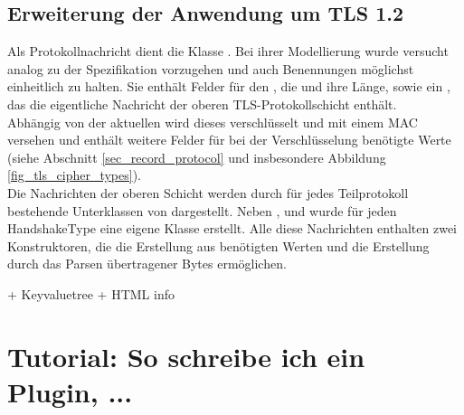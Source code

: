 \subsection{Erweiterung der Anwendung um TLS 1.2}


Als Protokollnachricht dient die Klasse . Bei ihrer Modellierung wurde versucht analog zu der Spezifikation vorzugehen und auch Benennungen möglichst einheitlich zu halten. Sie enthält Felder für den , die  und ihre Länge, sowie ein , das die eigentliche Nachricht der oberen TLS-Protokollschicht enthält. \\
Abhängig von der aktuellen \ciphersuite{} wird dieses  verschlüsselt und mit einem MAC versehen und enthält weitere Felder für bei der Verschlüsselung benötigte Werte (siehe Abschnitt \ref{sec_record_protocol} und insbesondere Abbildung \ref{fig_tls_cipher_types}). \\
Die Nachrichten der oberen Schicht werden durch für jedes Teilprotokoll bestehende Unterklassen von  dargestellt. Neben ,  und  wurde für jeden HandshakeType eine eigene Klasse erstellt. Alle diese Nachrichten enthalten zwei Konstruktoren, die die Erstellung aus benötigten Werten und die Erstellung durch das Parsen übertragener Bytes ermöglichen. 
	
	


+ Keyvaluetree 
+ HTML info

\section{Tutorial: So schreibe ich ein Plugin, ...}
